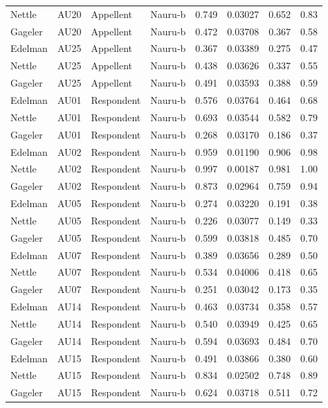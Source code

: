 \documentclass{monashthesis}
\begin{document}
\begin{center}
\begin{longtable}{llllllll}
Nettle & AU20 & Appellent & Nauru-b & 0.749 & 0.03027 & 0.652 & 0.83 \\
Gageler & AU20 & Appellent & Nauru-b & 0.472 & 0.03708 & 0.367 & 0.58 \\
Edelman & AU25 & Appellent & Nauru-b & 0.367 & 0.03389 & 0.275 & 0.47 \\
Nettle & AU25 & Appellent & Nauru-b & 0.438 & 0.03626 & 0.337 & 0.55 \\
Gageler & AU25 & Appellent & Nauru-b & 0.491 & 0.03593 & 0.388 & 0.59 \\
Edelman & AU01 & Respondent & Nauru-b & 0.576 & 0.03764 & 0.464 & 0.68 \\
Nettle & AU01 & Respondent & Nauru-b & 0.693 & 0.03544 & 0.582 & 0.79 \\
Gageler & AU01 & Respondent & Nauru-b & 0.268 & 0.03170 & 0.186 & 0.37 \\
Edelman & AU02 & Respondent & Nauru-b & 0.959 & 0.01190 & 0.906 & 0.98 \\
Nettle & AU02 & Respondent & Nauru-b & 0.997 & 0.00187 & 0.981 & 1.00 \\
Gageler & AU02 & Respondent & Nauru-b & 0.873 & 0.02964 & 0.759 & 0.94 \\
Edelman & AU05 & Respondent & Nauru-b & 0.274 & 0.03220 & 0.191 & 0.38 \\
Nettle & AU05 & Respondent & Nauru-b & 0.226 & 0.03077 & 0.149 & 0.33 \\
Gageler & AU05 & Respondent & Nauru-b & 0.599 & 0.03818 & 0.485 & 0.70 \\
Edelman & AU07 & Respondent & Nauru-b & 0.389 & 0.03656 & 0.289 & 0.50 \\
Nettle & AU07 & Respondent & Nauru-b & 0.534 & 0.04006 & 0.418 & 0.65 \\
Gageler & AU07 & Respondent & Nauru-b & 0.251 & 0.03042 & 0.173 & 0.35 \\
Edelman & AU14 & Respondent & Nauru-b & 0.463 & 0.03734 & 0.358 & 0.57 \\
Nettle & AU14 & Respondent & Nauru-b & 0.540 & 0.03949 & 0.425 & 0.65 \\
Gageler & AU14 & Respondent & Nauru-b & 0.594 & 0.03693 & 0.484 & 0.70 \\
Edelman & AU15 & Respondent & Nauru-b & 0.491 & 0.03866 & 0.380 & 0.60 \\
Nettle & AU15 & Respondent & Nauru-b & 0.834 & 0.02502 & 0.748 & 0.89 \\
Gageler & AU15 & Respondent & Nauru-b & 0.624 & 0.03718 & 0.511 & 0.72 \\

\end{longtable}
\end{center}
\end{document}

